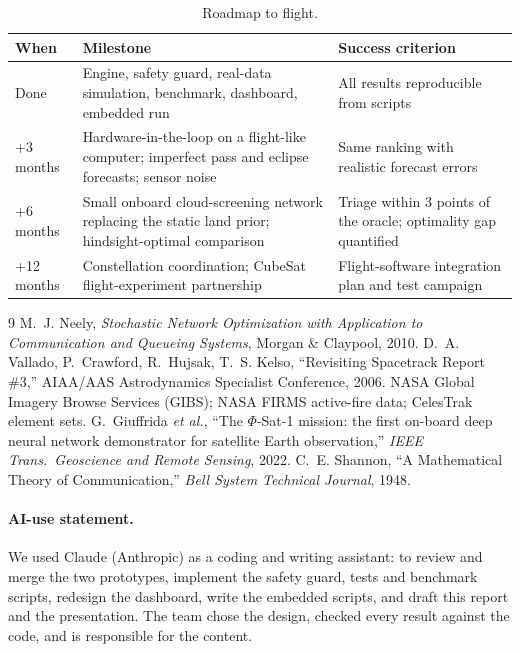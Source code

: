 \documentclass[11pt,a4paper]{article}
\begin{document}
\begin{table}[H]
\centering
\caption{Roadmap to flight.}
\small
\begin{tabularx}{\textwidth}{@{}l X X@{}}
\toprule
\textbf{When} & \textbf{Milestone} & \textbf{Success criterion} \\
\midrule
Done & Engine, safety guard, real-data simulation, benchmark, dashboard, embedded run & All results reproducible from scripts \\
+3 months & Hardware-in-the-loop on a flight-like computer; imperfect pass and eclipse forecasts; sensor noise & Same ranking with realistic forecast errors \\
+6 months & Small onboard cloud-screening network replacing the static land prior; hindsight-optimal comparison & Triage within 3 points of the oracle; optimality gap quantified \\
+12 months & Constellation coordination; CubeSat flight-experiment partnership & Flight-software integration plan and test campaign \\
\bottomrule
\end{tabularx}
\end{table}

\begin{thebibliography}{9}
 M.~J. Neely, \emph{Stochastic Network Optimization with Application to Communication and Queueing Systems}, Morgan \& Claypool, 2010.
 D.~A. Vallado, P.~Crawford, R.~Hujsak, T.~S. Kelso, ``Revisiting Spacetrack Report \#3,'' AIAA/AAS Astrodynamics Specialist Conference, 2006.
 NASA Global Imagery Browse Services (GIBS); NASA FIRMS active-fire data; CelesTrak element sets.
 G.~Giuffrida \emph{et al.}, ``The $\Phi$-Sat-1 mission: the first on-board deep neural network demonstrator for satellite Earth observation,'' \emph{IEEE Trans.\ Geoscience and Remote Sensing}, 2022.
 C.~E. Shannon, ``A Mathematical Theory of Communication,'' \emph{Bell System Technical Journal}, 1948.
\end{thebibliography}

\paragraph{AI-use statement.} We used Claude (Anthropic) as a coding and writing assistant: to review and
merge the two prototypes, implement the safety guard, tests and benchmark scripts, redesign the dashboard,
write the embedded scripts, and draft this report and the presentation. The team chose the design,
checked every result against the code, and is responsible for the content.
\end{document}
